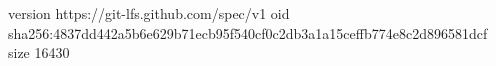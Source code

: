 version https://git-lfs.github.com/spec/v1
oid sha256:4837dd442a5b6e629b71ecb95f540cf0c2db3a1a15ceffb774e8c2d896581dcf
size 16430
